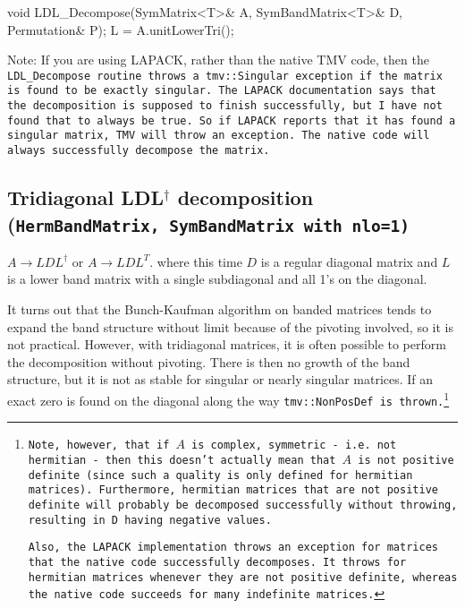 \begin{tmvcode}
void LDL_Decompose(SymMatrix<T>& A, SymBandMatrix<T>& D, Permutation& P);
L = A.unitLowerTri();
\end{tmvcode}

Note: If you are using LAPACK, rather than the native TMV code, then the 
\tt{LDL_Decompose} routine throws a
\tt{tmv::Singular} exception if the matrix is found to be exactly singular.  The LAPACK
documentation says that the decomposition is supposed to finish successfully, but I have
not found that to always be true.  So if LAPACK reports that it has found a singular matrix, TMV
will throw an exception.  The native code will always successfully decompose the matrix.

\subsection[Tridiagonal LDLt decomposition] {Tridiagonal LDL$^\dagger$ decomposition \rm (\tt{HermBandMatrix}, \tt{SymBandMatrix} with \tt{nlo=1})}

$A \rightarrow L D L^\dagger$ or $A \rightarrow L D L^T$.
where this time $D$ is a regular diagonal matrix and $L$ is
a lower band matrix with a single subdiagonal and all 1's on the diagonal.

It turns out
that the Bunch-Kaufman algorithm on banded matrices tends to expand the band structure
without limit because of the pivoting involved, so it is not practical.
However, with tridiagonal matrices, it is often possible to perform the 
decomposition without pivoting.  There is then no growth of the band structure,
but it is not as stable for singular or nearly singular matrices.
If an exact zero is found on the diagonal along the way
\tt{tmv::NonPosDef} is thrown.\footnote{
Note, however, that if $A$ is complex, symmetric - i.e. not hermitian -
then this doesn't actually mean that $A$ is not positive definite (since such a 
quality is only defined for hermitian matrices).  Furthermore, 
hermitian matrices that are not positive definite will probably be decomposed successfully
without throwing, resulting in D having negative values.

Also, the LAPACK implementation throws an exception for matrices that the native code
successfully decomposes.  It throws for hermitian matrices whenever they are 
not positive definite, whereas the native code succeeds for many indefinite matrices.
}

